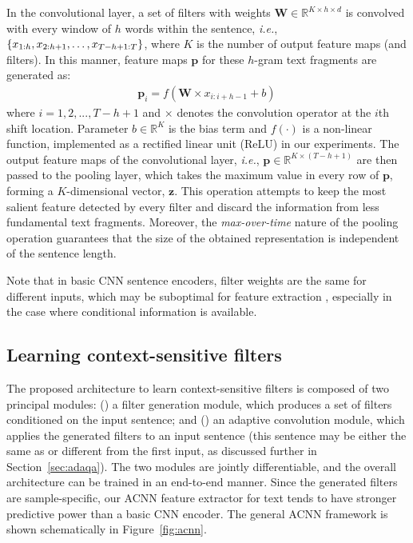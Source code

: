\documentclass[11pt,a4paper]{article}
\begin{document}
In the convolutional layer, a set of filters with weights $\boldsymbol{W} \in \mathbb{R}^{K \times h \times d}$ is convolved with every window of $h$ words within the sentence, \emph{i.e.}, $\left\{ {x}_{1:h}, {x}_{2:h+1}, \ldotp \ldotp \ldotp, {x}_{T-h+1:T} \right\} $, where $K$ is the number of output feature maps (and filters). In this manner, feature maps $\boldsymbol{p}$ for these $h$-gram text fragments are generated as:
\begin{align}
\boldsymbol{p}_i = f(\boldsymbol{W} \times x_{i:i+h-1} + b) \,
\label{eq:conv}
\end{align}
where $i=1,2,...,T-h+1$ and $\times$ denotes the convolution operator at the $i$th shift location. 
Parameter $b \in \mathbb{R}^{K}$ is the bias term and $f(\cdot)$ is a non-linear function, implemented as a rectified linear unit (ReLU) in our experiments. 
The output feature maps of the convolutional layer, \emph{i.e.}, $ \boldsymbol{p} \in \mathbb{R}^{K \times (T-h+1)} $ are then passed to the pooling layer, which takes the maximum value in every row of $\boldsymbol{p}$, forming a $K$-dimensional vector, $\boldsymbol{z}$. This operation attempts to keep the most salient feature detected by every filter and discard the information from less fundamental text fragments. Moreover, the \emph{max-over-time} nature of the pooling operation \citep{collobert2011natural} guarantees that the size of the obtained representation is independent of the sentence length.

Note that in basic CNN sentence encoders, filter weights are the same for different inputs, which may be suboptimal for feature extraction \citep{de2016dynamic}, especially in the case where conditional information is available.


\subsection{Learning context-sensitive filters} \label{sec:context}
The proposed architecture to learn context-sensitive filters is composed of two principal modules: (\emph{}) a filter generation module, which produces a set of filters conditioned on the input sentence; and (\emph{}) an adaptive convolution module, which applies the generated filters to an input sentence (this sentence may be either the same as or different from the first input, as discussed further in Section~\ref{sec:adaqa}). The two modules are jointly differentiable, and the overall architecture can be trained in an end-to-end manner. Since the generated filters are sample-specific, our ACNN feature extractor for text tends to have stronger predictive power than a basic CNN encoder. The general ACNN framework is shown schematically in Figure~\ref{fig:acnn}.
\end{document}
